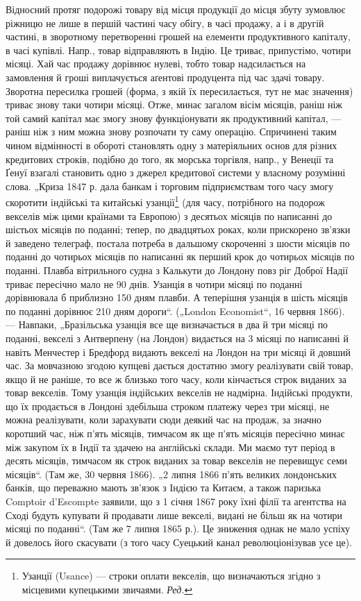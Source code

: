 Відносний протяг подорожі товару від місця продукції до місця
збуту зумовлює ріжницю не лише в першій частині часу обігу, в часі
продажу, а і в другій частині, в зворотному перетворенні грошей
на елементи продуктивного капіталу, в часі купівлі. Напр., товар відправляють
в Індію. Це триває, припустімо, чотири місяці. Хай час продажу
дорівнює нулеві, тобто товар надсилається на замовлення й гроші
виплачується аґентові продуцента під час здачі товару. Зворотна пересилка
грошей (форма, з якій їх пересилається, тут не має значення) триває
знову таки чотири місяці. Отже, минає загалом вісім місяців, раніш
ніж той самий капітал має змогу знову функціонувати як продуктивний капітал,
— раніш ніж з ним можна знову розпочати ту саму операцію.
Спричинені таким чином відмінності в обороті становлять одну з матеріяльних
основ для різних кредитових строків, подібно до того, як
морська торгівля, напр., у Венеції та Ґенуї взагалі становить одно з
джерел кредитової системи у власному розумінні слова. „Криза 1847 р.
дала банкам і торговим підприємствам того часу змогу скоротити індійські
та китайські узанції\footnote*{
Узанції (Usance) — строки оплати векселів, що визначаються згідно з місцевими
купецькими звичаями. \emph{Ред.}
} (для часу, потрібного на подорож векселів
між цими країнами та Европою) з десятьох місяців по написанні до
шістьох місяців по поданні; тепер, по двадцятьох роках, коли прискорено
зв’язки й заведено телеграф, постала потреба в дальшому скороченні
з шости місяців по поданні до чотирьох місяців по написанні як
перший крок до чотирьох місяців по поданні. Плавба вітрильного судна
з Калькути до Лондону повз ріг Доброї Надії триває пересічно мало
не 90 днів. Узанція в чотири місяці по поданні дорівнювала б приблизно
150 дням плавби. А теперішня узанція в шість місяців по поданні
дорівнює 210 дням дороги“. („London Economist“, 16 червня 1866). —
Навпаки, „Бразільська узанція все ще визначається в два й три місяці
по поданні, векселі з Антверпену (на Лондон) видається на 3 місяці по
написанні й навіть Менчестер і Бредфорд видають векселі на Лондон на
три місяці й довший час. За мовчазною згодою купцеві дається достатню
змогу реалізувати свій товар, якщо й не раніше, то все ж
близько того часу, коли кінчається строк виданих за товар векселів.
Тому узанція індійських векселів не надмірна. Індійські продукти, що
їх продається в Лондоні здебільша строком платежу через три місяці,
не можна реалізувати, коли зарахувати сюди деякий час на продаж, за
значно коротший час, ніж п’ять місяців, тимчасом як ще п’ять місяців
пересічно минає між закупом їх в Індії та здачею на англійські склади.
Ми маємо тут період в десять місяців, тимчасом як строк виданих за
товар векселів не перевищує семи місяців“. (Там же, 30 червня 1866).
„2 липня 1866 п’ять великих лондонських банків, що переважно мають
зв’язок з Індією та Китаєм, а також паризька Comptoir d’Escompte заявили,
що з 1 січня 1867 року їхні філії та агентства на Сході будуть
купувати й продавати лише векселі, видані не більш як на чотири місяці
по поданні“. (Там же 7 липня 1865 р.). Це зниження однак не мало
успіху й довелось його скасувати (з того часу Суецький канал революціонізував
усе це).

